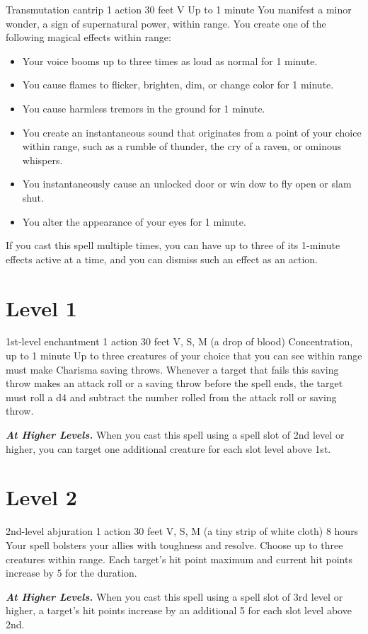 \documentclass[10pt,twoside,twocolumn,openany]{book}
\begin{document}
{Transmutation cantrip}
{\color{action} 1 action}
{30 feet}
{V}
{Up to 1 minute}
%
You manifest a minor wonder, a sign of supernatural power, within range. You create one of the following magical effects within range:
\begin{itemize}
	\item Your voice booms up to three times as loud as normal for 1 minute.
	\item You cause flames to flicker, brighten, dim, or change color for 1 minute.
	\item You cause harmless tremors in the ground for 1 minute.
	\item You create an instantaneous sound that originates from a point of your choice within range, such as a rumble of thunder, the cry of a raven, or ominous whispers.
	\item You instantaneously cause an unlocked door or win  dow to fly open or slam shut.
	\item You alter the appearance of your eyes for 1 minute.
\end{itemize}
If you cast this spell multiple times, you can have up to three of its 1-minute effects active at a time, and you can dismiss such an effect as an action.

\newpage
\section{Level 1}
{1st-level enchantment}
{\color{action} 1 action}
{30 feet}
{V, S, M (a drop of blood)}
{Concentration, up to 1 minute}
%
Up to three creatures of your choice that you can see within range must make Charisma saving throws. Whenever a target that fails this saving throw makes an attack roll or a saving throw before the spell ends, the target must roll a d4 and subtract the number rolled from the attack roll or saving throw.

\textbf{\textit{At Higher Levels.}} When you cast this spell using a spell slot of 2nd level or higher, you can target one additional creature for each slot level above 1st.

\newpage
\section{Level 2}
{2nd-level abjuration}
{\color{action}1 action}
{30 feet}
{V, S, M (a tiny strip of white cloth)}
{8 hours}
%
Your spell bolsters your allies with toughness and resolve. Choose up to three creatures within range. Each target's hit point maximum and current hit points increase by 5 for the duration.

\textbf{\textit{At Higher Levels.}} When you cast this spell using
a spell slot of 3rd level or higher, a target's hit points increase by an additional 5 for each slot level above 2nd.

\newpage
\printindex
\printindex[cr]
\end{document}
